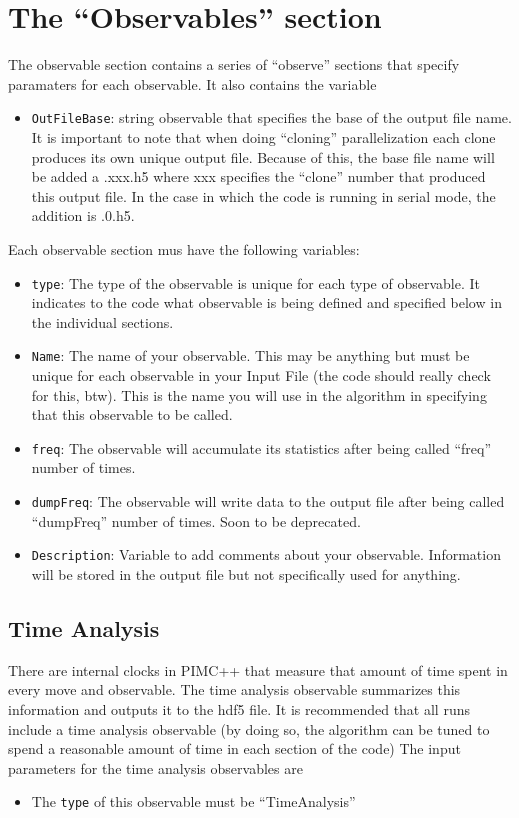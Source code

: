 \documentclass{book}
\begin{document}
\section{The ``Observables'' section}
The observable section contains a series of ``observe'' sections that
specify paramaters for each observable.  It also contains the
variable \\
\begin{itemize}
\item \texttt{OutFileBase}:  string observable that specifies the base
  of the output file name. It is important to note that when doing
  ``cloning'' parallelization each clone produces its own unique
  output file. Because of this, the base file name will be added a .xxx.h5
  where xxx specifies the ``clone'' number that produced this output
  file. In the case in which the code is running in serial mode, the
  addition is .0.h5.
\end{itemize}
Each observable section mus have the following variables:
\begin{itemize}
\item \texttt{type}: The type of the observable is unique for each
  type of observable.  It indicates to the code what observable is being
  defined and specified below in the individual sections.

\item \texttt{Name}: The name of your observable. This may be anything
   but must be unique for each observable in your Input File (the code should
   really check for this, btw).  This is the name you will use in the
   algorithm in specifying that this observable to be called.

\item \texttt{freq}:  The observable will accumulate its statistics
  after being called ``freq'' number of times.  
\item \texttt{dumpFreq}: The observable will write data to the output
  file after being called ``dumpFreq'' number of times. Soon to be
  deprecated.
\item \texttt {Description}: Variable to add comments about your
  observable. Information will be stored in the output file but not
  specifically used for anything.

\end{itemize}
\subsection{Time Analysis}
There are internal clocks in PIMC++ that measure that amount of time
spent in every move and observable.  The time analysis observable
summarizes this information and outputs it to the hdf5 file. It is
recommended that all runs include a time analysis observable (by doing
so, the algorithm can be tuned to spend a reasonable amount of time in
each section of the code) 
The input parameters for the time analysis observables are 
\begin{itemize}
\item The \texttt{type} of this observable must be ``TimeAnalysis''
\end{itemize}
\end{document}

